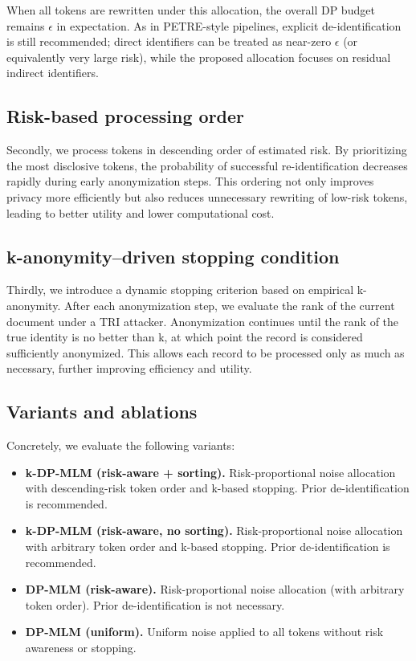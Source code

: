 \documentclass[10pt, a4paper]{article}
\begin{document}
When all tokens are rewritten under this allocation, the overall DP budget remains $\epsilon$ in expectation. As in PETRE-style pipelines, explicit de-identification is still recommended; direct identifiers can be treated as near-zero $\epsilon$ (or equivalently very large risk), while the proposed allocation focuses on residual indirect identifiers.

\subsection{Risk-based processing order}

Secondly, we process tokens in descending order of estimated risk. By prioritizing the most disclosive tokens, the probability of successful re-identification decreases rapidly during early anonymization steps. This ordering not only improves privacy more efficiently but also reduces unnecessary rewriting of low-risk tokens, leading to better utility and lower computational cost.

\subsection{k-anonymity–driven stopping condition}

Thirdly, we introduce a dynamic stopping criterion based on empirical k-anonymity. After each anonymization step, we evaluate the rank of the current document under a TRI attacker. Anonymization continues until the rank of the true identity is no better than k, at which point the record is considered sufficiently anonymized. This allows each record to be processed only as much as necessary, further improving efficiency and utility.

\subsection{Variants and ablations}

Concretely, we evaluate the following variants:
\begin{itemize}
    \item \textbf{k-DP-MLM (risk-aware + sorting).} Risk-proportional noise allocation with descending-risk token order and k-based stopping. Prior de-identification is recommended.
    \item \textbf{k-DP-MLM (risk-aware, no sorting).} Risk-proportional noise allocation with arbitrary token order and k-based stopping. Prior de-identification is recommended.
    \item \textbf{DP-MLM (risk-aware).} Risk-proportional noise allocation (with arbitrary token order). Prior de-identification is not necessary.
    \item \textbf{DP-MLM (uniform).} Uniform noise applied to all tokens without risk awareness or stopping.
\end{itemize}
\end{document}
